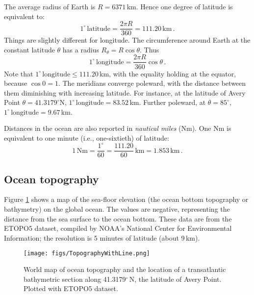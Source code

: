 \documentclass[11pt]{article}
\newcommand{\per}{\,.}
\def\beq{\begin{equation}}
\def\eeq{\end{equation}}
\begin{document}
The average radius of Earth is $R = 6371$\,km. Hence one degree of latitude is
equivalent to:
\beq
1^\circ\, \text{latitude} = \frac{2\pi R}{360} = 111.20\,\text{km}\per
\eeq
Things are slightly different for longitude. The circumference
around Earth at the constant latitude $\theta$ has a radius $R_\theta = R \cos\theta$. Thus
\beq
1^\circ\, \text{longitude} = \frac{2\pi R}{360}\cos\theta\per
\eeq
Note that  $1^\circ\, \text{longitude}
\le 111.20$\,km, with the equality holding at the equator, because
$\cos 0 = 1$. The meridians converge poleward, with the distance between them
diminishing with increasing latitude. For instance, at the latitude of Avery Point $\theta = 41.3179^\circ$N, $1^\circ\, \text{longitude} = 83.52$\,km. Further poleward, at $\theta = 85^\circ$,
 $1^\circ\, \text{longitude} = 9.67$\,km.

Distances in the ocean are also reported in \emph{nautical miles} (Nm). One Nm is equivalent
to one minute (i.e., one-sixtieth) of latitude:
\beq
1\,\text{Nm} = \frac{1^\circ}{60} = \frac{111.20}{60} \,\text{km} = 1.853\,\text{km}\per
\eeq

\subsection{Ocean topography}
Figure \ref{ETOPO} shows a map of the sea-floor elevation (the ocean bottom topography or bathymetry)
on the global ocean. The values are negative, representing the distance from the sea surface to the
ocean bottom. These data are from the ETOPO5 dataset, compiled by NOAA's National Center for Environmental Information; the resolution is 5 minutes of latitude (about 9\,km).

\begin{figure}[ht]
\centering
\texttt{[image: figs/TopographyWithLine.png]}\\
\caption{\small World map of ocean topography and the location of a transatlantic bathymetric section along 41.3179$^\circ$\,N, the latitude of Avery Point. Plotted with ETOPO5 dataset. }
\label{ETOPO}
\end{figure}
\end{document}
